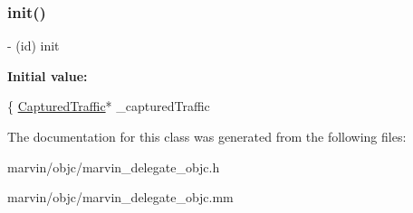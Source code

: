\subsubsection{\texorpdfstring{init()}{init()}}
{\footnotesize\ttfamily -\/ (id) init \begin{DoxyParamCaption}{ }\end{DoxyParamCaption}}

{\bfseries Initial value\+:}
\begin{DoxyCode}
\{
    \hyperlink{interface_captured_traffic}{CapturedTraffic}* \_capturedTraffic
\end{DoxyCode}


The documentation for this class was generated from the following files\+:\begin{DoxyCompactItemize}
\item 
marvin/objc/marvin\+\_\+delegate\+\_\+objc.\+h\item 
marvin/objc/marvin\+\_\+delegate\+\_\+objc.\+mm\end{DoxyCompactItemize}
